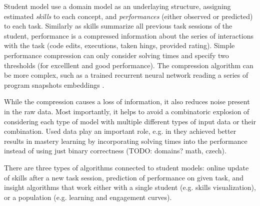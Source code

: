 Student model use a domain model as an underlaying structure,
assigning estimated \emph{skills} to each concept, %
and \emph{performances} (either observed or predicted) to each task.
Similarly as skills summarize all previous task sessions of the student,
performance is a compressed information about the series of
interactions with the task (code edits, executions, taken hings, provided rating).
Simple performance compression can only consider solving times and specify two
thresholds (for excelllent and good performance).
The compression algorithm can be more complex,
such as a trained recurrent neural network reading a series
of program snapshots embeddings  %
\cite{student-models-deep-learning}.

While the compression causes a loss of information, it also reduces noise
present in the raw data. Most importantly, it helps to avoid a combinatoric
explosion of considering each type of model with multiple different types of
input data or their combination.
Used data play an important role, e.g. in \cite{alg.mastery} they achieved
better results in mastery learning by incorporating solving times into the
performance instead of using just binary correctness (TODO: domains? math,
czech).

There are three types of algorithms connected to student models: online update
of skills after a new task session, prediction of performance on given task,
and insight algorithms that work either with a single student (e.g. skills
visualization), or a population (e.g. learning and engagement curves).




